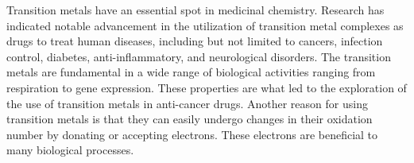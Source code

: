 Transition metals have an essential spot in medicinal chemistry. Research has indicated notable advancement in the utilization of transition metal complexes as drugs to treat human diseases, including but not limited to cancers, infection control, diabetes, anti-inflammatory, and neurological disorders. The transition metals are fundamental in a wide range of biological activities ranging from respiration to gene expression. These properties are what led to the exploration of the use of transition metals in anti-cancer drugs. Another reason for using transition metals is that they can easily undergo changes in their oxidation number by donating or accepting electrons. These electrons are beneficial to many biological processes.